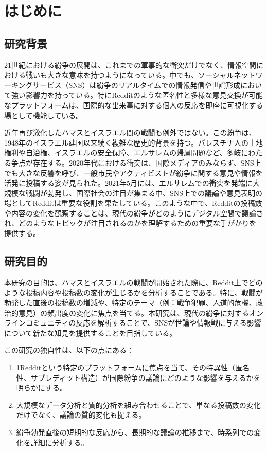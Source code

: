 \documentclass[11pt, a4j]{jreport}
\begin{document}
    \chapter{はじめに} %

    \section{研究背景} %
    21世紀における紛争の展開は、これまでの軍事的な衝突だけでなく、情報空間における戦いも大きな意味を持つようになっている。中でも、ソーシャルネットワーキングサービス（SNS）は紛争のリアルタイムでの情報発信や世論形成において強い影響力を持っている。特にRedditのような匿名性と多様な意見交換が可能なプラットフォームは、国際的な出来事に対する個人の反応を即座に可視化する場として機能している。

    近年再び激化したハマスとイスラエル間の戦闘も例外ではない。この紛争は、1948年のイスラエル建国以来続く複雑な歴史的背景を持つ。パレスチナ人の土地権利や自治権、イスラエルの安全保障、エルサレムの帰属問題など、多岐にわたる争点が存在する。2020年代における衝突は、国際メディアのみならず、SNS上でも大きな反響を呼び、一般市民やアクティビストが紛争に関する意見や情報を活発に投稿する姿が見られた。2021年5月には、エルサレムでの衝突を発端に大規模な戦闘が勃発し、国際社会の注目が集まる中、SNS上での議論や意見表明の場としてRedditは重要な役割を果たしている。このような中で、Redditの投稿数や内容の変化を観察することは、現代の紛争がどのようにデジタル空間で議論され、どのようなトピックが注目されるのかを理解するための重要な手がかりを提供する。

    \section{研究目的}
    本研究の目的は、ハマスとイスラエルの戦闘が開始された際に、Reddit上でどのような投稿内容や投稿数の変化が生じるかを分析することである。特に、戦闘が勃発した直後の投稿数の増減や、特定のテーマ（例：戦争犯罪、人道的危機、政治的意見）の頻出度の変化に焦点を当てる。本研究は、現代の紛争に対するオンラインコミュニティの反応を解析することで、SNSが世論や情報戦に与える影響について新たな知見を提供することを目指している。

    この研究の独自性は、以下の点にある：

    \begin{enumerate}
        \item 1Redditという特定のプラットフォームに焦点を当て、その特異性（匿名性、サブレディット構造）が国際紛争の議論にどのような影響を与えるかを明らかにする。

        \item 大規模なデータ分析と質的分析を組み合わせることで、単なる投稿数の変化だけでなく、議論の質的変化も捉える。

        \item 紛争勃発直後の短期的な反応から、長期的な議論の推移まで、時系列での変化を詳細に分析する。
    \end{enumerate}
\end{document}
